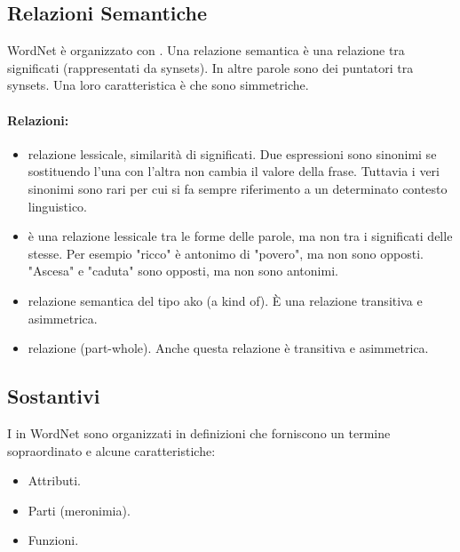 
\subsection{Relazioni Semantiche}

WordNet è organizzato con . Una relazione semantica è una relazione tra significati (rappresentati da synsets). In altre parole sono dei puntatori tra synsets. Una loro caratteristica è che sono simmetriche. 

\paragraph{Relazioni:}

\begin{itemize}
  \item {} relazione lessicale, similarità di significati. Due espressioni sono sinonimi se sostituendo l'una con l'altra non cambia il valore della frase. Tuttavia i veri sinonimi sono rari per cui si fa sempre riferimento a un determinato contesto linguistico.
  \item {} è una relazione lessicale tra le forme delle parole, ma non tra i significati delle stesse. Per esempio "ricco" è antonimo di "povero", ma non sono opposti. "Ascesa" e "caduta" sono opposti, ma non sono antonimi.
  \item {} relazione semantica del tipo ako (a kind of). È una relazione transitiva e asimmetrica.
  \item {} relazione  (part-whole). Anche questa relazione è transitiva e asimmetrica.
\end{itemize}

\subsection{Sostantivi}

I  in WordNet sono organizzati in definizioni che forniscono un termine sopraordinato e alcune caratteristiche: 
\begin{itemize}
  \item Attributi. 
  \item Parti (meronimia). 
  \item Funzioni.
\end{itemize}

